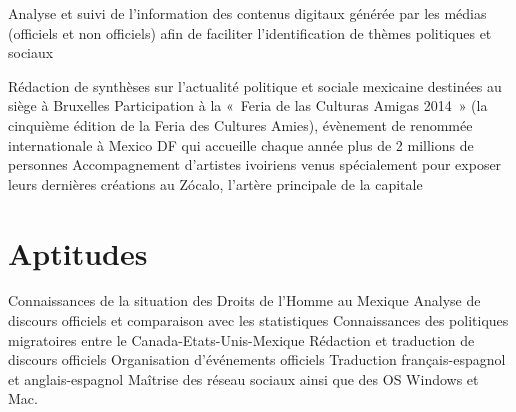 \documentclass[30pt, french]{tccv}
\begin{document}
\begin{upshape}
\begin{experience}
 Analyse et suivi de l’information des contenus digitaux générée par les médias (officiels et non officiels) afin de faciliter l’iden\-ti\-fi\-ca\-tion de thèmes politiques et sociaux \\
    \setlength{\parskip}{-10pt}
    \begin{itemize}
      \cvitem[\checkmark] Rédaction de synthèses sur l’actualité politique et sociale mexicaine destinées au siège à Bruxelles
      \cvitem[\checkmark] Participation à la « Feria de las Culturas Amigas 2014 » (la cinquième édition de la Feria des Cultures Amies), évènement de renommée internationale à Mexico DF qui accueille chaque année plus de 2 millions de personnes 
      \cvitem[\checkmark] Accompagnement d’artistes ivoiriens venus spécialement pour exposer leurs dernières créations au Zócalo, l’artère principale de la capitale
    \end{itemize}     




\section{Aptitudes}
\setlength{\parskip}{0pt}
\begin{itemize}[leftmargin=13pt]
  \cvitem[\checkmark]  Connaissances de la situation des Droits de l’Homme au Mexique
  \cvitem[\checkmark]  Analyse de discours officiels et comparaison avec les statistiques
  \cvitem[\checkmark]  Connaissances des politiques migratoires entre le Canada-Etats-Unis-Mexique
  \cvitem[\checkmark]  Rédaction et traduction de discours officiels
  \cvitem[\checkmark]  Organisation d’événements officiels
  \cvitem[\checkmark]  Traduction français-espagnol et anglais-espagnol
  \cvitem[\checkmark]  Maîtrise des réseau sociaux ainsi que des OS Windows et Mac. 
\end{itemize}
\end{experience}





\end{upshape}
\end{document}
